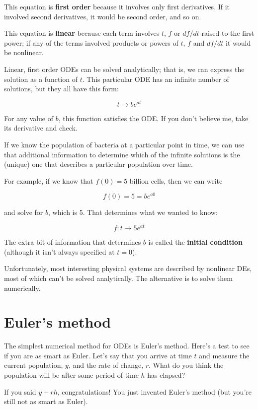 \documentclass{book}
\begin{document}
This equation is {\bf first order} because it involves only first
derivatives. If it involved second derivatives, it would be second order,
and so on.

This equation is {\bf linear} because each term involves $t$, $f$ or
$df/dt$ raised to the first power; if any of the terms involved
products or powers of $t$, $f$ and $df/dt$ it would be
nonlinear.

Linear, first order ODEs can be solved analytically; that is, we
can express the solution as a function of $t$.
This particular ODE has an infinite number of solutions, but
they all have this form:

\[ t \to b e^{at} \]

For any value of $b$, this function satisfies the ODE. If you don't
believe me, take its derivative and check.

If we know the population of bacteria at a particular point in time,
we can use that additional information to determine which of the
infinite solutions is the (unique) one that describes a particular
population over time.

For example, if we know that $f(0) = 5$ billion cells, then we
can write

\[ f(0) = 5 = b e^{a 0} \]

and solve for $b$, which is 5. That determines what we wanted
to know:

\[ f : t \to 5 e^{at} \]

The extra bit of information that determines $b$ is called
the {\bf initial condition} (although it isn't always specified
at $t=0$).

Unfortunately, most interesting physical systems are described by
nonlinear DEs, most of which can't be solved analytically. The
alternative is to solve them numerically.


\section{Euler's method}

The simplest numerical method for ODEs is Euler's method. Here's a
test to see if you are as smart as Euler. Let's say that you
arrive at time $t$ and measure the current population, $y$, and
the rate of change, $r$. What do you think the population will
be after some period of time $h$ has elapsed?

If you said $y + r h$, congratulations! You just invented
Euler's method (but you're still not as smart as Euler).
\end{document}
